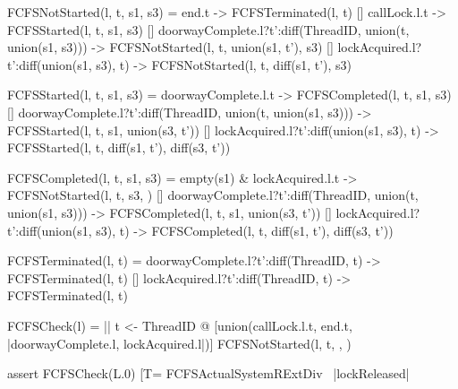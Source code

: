\begin{cspm}
  FCFSNotStarted(l, t, s1, s3) = 
     end.t -> FCFSTerminated(l, t)
  [] callLock.l.t -> FCFSStarted(l, t, s1, s3)
  [] doorwayComplete.l?t':diff(ThreadID, union({t}, union(s1, s3))) -> FCFSNotStarted(l, t, union(s1, {t'}), s3)
  [] lockAcquired.l?t':diff(union(s1, s3), {t}) -> FCFSNotStarted(l, t, diff(s1, {t'}), s3)


FCFSStarted(l, t, s1, s3) = 
     doorwayComplete.l.t -> FCFSCompleted(l, t, s1, s3)
  [] doorwayComplete.l?t':diff(ThreadID, union({t}, union(s1, s3))) -> FCFSStarted(l, t, s1, union(s3, {t'}))
  [] lockAcquired.l?t':diff(union(s1, s3), {t}) -> FCFSStarted(l, t, diff(s1, {t'}), diff(s3, {t'}))

FCFSCompleted(l, t, s1, s3) = 
     empty(s1) & lockAcquired.l.t -> FCFSNotStarted(l, t, s3, {})
  [] doorwayComplete.l?t':diff(ThreadID, union({t}, union(s1, s3))) -> FCFSCompleted(l, t, s1, union(s3, {t'}))
  [] lockAcquired.l?t':diff(union(s1, s3), {t}) -> FCFSCompleted(l, t, diff(s1, {t'}), diff(s3, {t'}))

FCFSTerminated(l, t) = 
     doorwayComplete.l?t':diff(ThreadID, {t}) -> FCFSTerminated(l, t)
  [] lockAcquired.l?t':diff(ThreadID, {t}) -> FCFSTerminated(l, t)
\end{cspm}

\begin{cspm}
FCFSCheck(l) = 
  || t <- ThreadID @ [union({callLock.l.t, end.t}, {|doorwayComplete.l, lockAcquired.l|})]
        FCFSNotStarted(l, t, {}, {})

assert FCFSCheck(L.0) [T= FCFSActualSystemRExtDiv \ {|lockReleased|}
\end{cspm}

